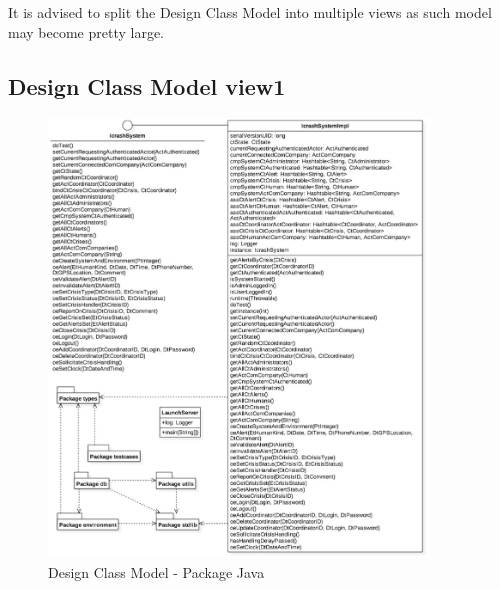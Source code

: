 It is advised to split the Design Class Model into multiple views as such model
may become pretty large. 
	

\subsection{Design Class Model view1}
\begin{figure}[h!]
	\centering
	\includegraphics[width=0.9\textwidth]{./images/dcm_java.eps}
	\caption{Design Class Model - Package Java}
\end{figure}


